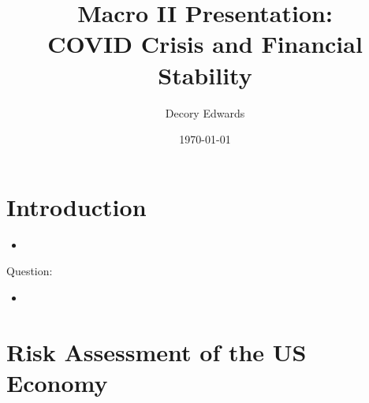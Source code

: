 \documentclass{beamer}
\title[COVID Crisis and Financial Stability]{Macro II Presentation:\\ COVID Crisis and Financial Stability}
\author{Decory Edwards}
\date{\today}
\begin{document}
\section{Introduction}

\begin{frame}{}
    
    \begin{itemize}
        \item  
    \end{itemize}
    
\vspace{2em}    
    Question:
  \end{frame}

\begin{frame}{}

    \begin{itemize}
        \item 
    \end{itemize}
  \end{frame}

\begin{frame}{}
    \begin{figure}[H]
    \centering
    \caption{}
\end{figure}
\end{frame}


\section{Risk Assessment of the US Economy}
\end{document}
